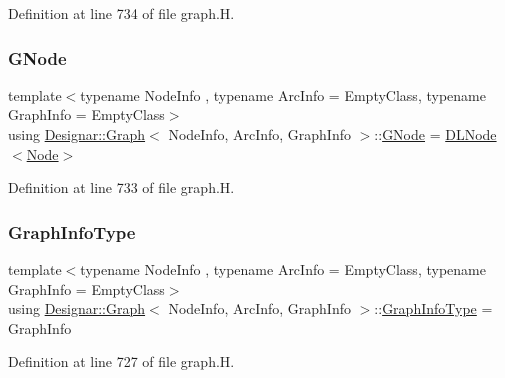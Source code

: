 Definition at line 734 of file graph.\+H.

\mbox{\label{class_designar_1_1_graph_a7e61951db0bb9bfa8a2e317440d4e17f}} 
\subsubsection{\texorpdfstring{G\+Node}{GNode}}
{\footnotesize\ttfamily template$<$typename Node\+Info , typename Arc\+Info  = Empty\+Class, typename Graph\+Info  = Empty\+Class$>$ \\
using \hyperlink{class_designar_1_1_graph}{Designar\+::\+Graph}$<$ Node\+Info, Arc\+Info, Graph\+Info $>$\+::\hyperlink{class_designar_1_1_graph_a7e61951db0bb9bfa8a2e317440d4e17f}{G\+Node} =  \hyperlink{class_designar_1_1_d_l_node}{D\+L\+Node}$<$\hyperlink{class_designar_1_1_graph_a5dfc7dba9d092ac489c72e40390c37d0}{Node}$>$\hspace{0.3cm}{\ttfamily [protected]}}



Definition at line 733 of file graph.\+H.

\mbox{\label{class_designar_1_1_graph_a5b6ad505f3b0f5a5cd288a13bebf2d27}} 
\subsubsection{\texorpdfstring{Graph\+Info\+Type}{GraphInfoType}}
{\footnotesize\ttfamily template$<$typename Node\+Info , typename Arc\+Info  = Empty\+Class, typename Graph\+Info  = Empty\+Class$>$ \\
using \hyperlink{class_designar_1_1_graph}{Designar\+::\+Graph}$<$ Node\+Info, Arc\+Info, Graph\+Info $>$\+::\hyperlink{class_designar_1_1_graph_a5b6ad505f3b0f5a5cd288a13bebf2d27}{Graph\+Info\+Type} =  Graph\+Info}



Definition at line 727 of file graph.\+H.

\mbox{\label{class_designar_1_1_graph_a5dfc7dba9d092ac489c72e40390c37d0}} 
